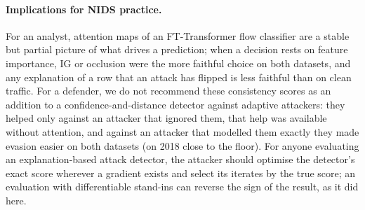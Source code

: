 \paragraph{Implications for NIDS practice.}
For an analyst, attention maps of an FT-Transformer flow classifier are a stable but partial picture of what drives a
prediction; when a decision rests on feature importance, IG or occlusion were the more faithful choice on both
datasets, and any explanation of a row that an attack has flipped is less faithful than on clean traffic.
For a defender, we do not recommend these consistency scores as an addition to a confidence-and-distance detector
against adaptive attackers: they helped only against an attacker that ignored them, that help was available without
attention, and against an attacker that modelled them exactly they made evasion easier on both datasets (on 2018
close to the floor).
For anyone evaluating an explanation-based attack detector, the attacker should optimise the detector's exact score
wherever a gradient exists and select its iterates by the true score; an evaluation with differentiable stand-ins can
reverse the sign of the result, as it did here.
